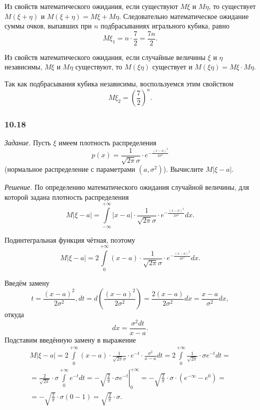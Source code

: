 Из свойств математического ожидания, если существуют $M \xi $ и $M \eta $, то существует $M \left( \xi + \eta \right) $ и $M \left( \xi + \eta \right) = M \xi + M \eta $.
Следовательно математическое ожидание суммы очков, выпавших при $n$ подбрасываниях игрального кубика, равно
$$M \xi_1 =
n \cdot \frac{7}{2} =
\frac{7n}{2}.$$

Из свойств математического ожидания,
если случайные величины $ \xi $ и $ \eta $ независимы,
$M \xi $ и $M \eta $ существуют, то $M \left( \xi \eta \right) $ существует и $M \left( \xi \eta \right) = M \xi \cdot M \eta $.

Так как подбрасывания кубика независимы, воспользуемся этим свойством
$$M \xi_2 =
\left( \frac{7}{2} \right)^n.$$

\subsubsection*{10.18}

\textit{Задание.} Пусть $ \xi $ имеем плотность распределения
$$p \left( x \right) =
\frac{1}{ \sqrt{2 \pi } \sigma } \cdot e^{- \frac{ \left( x-a \right)^2}{2 \sigma^2}}$$
(нормальное распределение с параметрами $ \left( a, \sigma^2 \right) $).
Вычислите $ M \left| \xi - a \right| $.

\textit{Решение.} По определению математического ожидания случайной величины, для которой задана плотность распределения
$$M \left| \xi - a \right| =
\int \limits_{- \infty }^{+ \infty } \left| x - a \right| \cdot \frac{1}{ \sqrt{2 \pi } \sigma } \cdot e^{- \frac{ \left( x - a \right)^2}{2 \sigma^2}} dx.$$

Подинтегральная функция чётная, поэтому
$$M \left| \xi - a \right| =
2 \int \limits_0^{+ \infty } \left( x - a \right) \cdot \frac{1}{ \sqrt{2 \pi } \sigma } \cdot e^{- \frac{ \left( x - a \right)^2}{2 \sigma^2}} dx.$$

Введём замену
$$t = \frac{ \left( x-a \right)^2}{2 \sigma^2},
dt = d \left( \frac{ \left( x-a \right)^2}{2 \sigma^2} \right) = \frac{2 \left( x-a \right) }{2 \sigma^2} dx = \frac{x-a}{ \sigma^2} dx,$$
откуда
$$dx = \frac{ \sigma^2 dt}{x-a}.$$
Подставим введённую замену в выражение
\begin{equation*}
\begin{split}
M \left| \xi - a \right| =
2 \int \limits_0^{+ \infty } \left( x-a \right) \cdot \frac{1}{ \sqrt{2 \pi } \sigma } \cdot e^{-t} \cdot \frac{ \sigma^2}{x-a} dt =
2 \int \limits_0^{+ \infty } \frac{1}{ \sqrt{2 \pi }} \cdot \sigma e^{-t} dt = \\
= \frac{2}{ \sqrt{2 \pi }} \cdot \sigma \int \limits_0^{+ \infty } e^{-t} dt =
\left. - \sqrt{ \frac{2}{ \pi }} \cdot \sigma e^{-t} \right|_0^{+ \infty } =
- \sqrt{ \frac{2}{ \pi }} \cdot \sigma \cdot \left( e^{- \infty } - e^0 \right) = \\
= - \sqrt{ \frac{2}{ \pi }} \cdot \sigma \left( 0 - 1 \right) =
\sqrt{ \frac{2}{ \pi }} \cdot \sigma.
\end{split}
\end{equation*}

